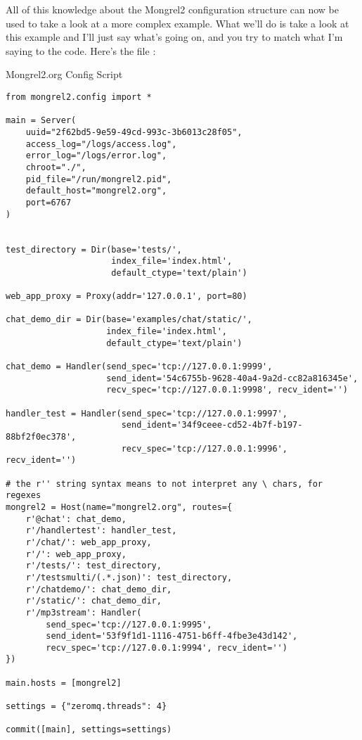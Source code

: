 All of this knowledge about the Mongrel2 configuration structure can now be used to take a look at 
a more complex example.  What we'll do is take a look at this example and I'll just say what's 
going on, and you try to match what I'm saying to the code.  Here's the file :

\begin{code}{Mongrel2.org Config Script}
\begin{verbatim}
from mongrel2.config import *

main = Server(
    uuid="2f62bd5-9e59-49cd-993c-3b6013c28f05",
    access_log="/logs/access.log",
    error_log="/logs/error.log",
    chroot="./",
    pid_file="/run/mongrel2.pid",
    default_host="mongrel2.org",
    port=6767
)


test_directory = Dir(base='tests/',
                     index_file='index.html',
                     default_ctype='text/plain')

web_app_proxy = Proxy(addr='127.0.0.1', port=80)

chat_demo_dir = Dir(base='examples/chat/static/', 
                    index_file='index.html', 
                    default_ctype='text/plain')

chat_demo = Handler(send_spec='tcp://127.0.0.1:9999',
                    send_ident='54c6755b-9628-40a4-9a2d-cc82a816345e',
                    recv_spec='tcp://127.0.0.1:9998', recv_ident='')

handler_test = Handler(send_spec='tcp://127.0.0.1:9997',
                       send_ident='34f9ceee-cd52-4b7f-b197-88bf2f0ec378',
                       recv_spec='tcp://127.0.0.1:9996', recv_ident='')

# the r'' string syntax means to not interpret any \ chars, for regexes
mongrel2 = Host(name="mongrel2.org", routes={
    r'@chat': chat_demo,
    r'/handlertest': handler_test,
    r'/chat/': web_app_proxy,
    r'/': web_app_proxy,
    r'/tests/': test_directory,
    r'/testsmulti/(.*.json)': test_directory,
    r'/chatdemo/': chat_demo_dir,
    r'/static/': chat_demo_dir,
    r'/mp3stream': Handler(
        send_spec='tcp://127.0.0.1:9995',
        send_ident='53f9f1d1-1116-4751-b6ff-4fbe3e43d142',
        recv_spec='tcp://127.0.0.1:9994', recv_ident='')
})

main.hosts = [mongrel2]

settings = {"zeromq.threads": 4}

commit([main], settings=settings)

\end{verbatim}
\end{code}

